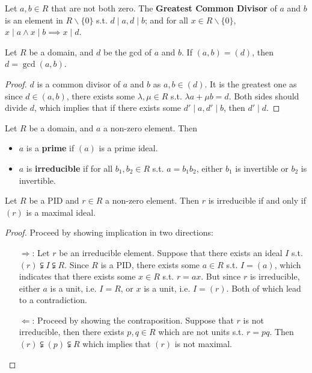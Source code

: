 \documentclass{article}
\begin{document}
\begin{definition}
    Let $a, b\in R$ that are not both zero. The \textbf{Greatest Common Divisor} of $a$ and $b$ is an element in $R\smallsetminus\{0\}$ s.t.
    $d\mid a, d\mid b$; and for all $x\in R\smallsetminus\{0\}$, $x\mid a \wedge x\mid b \implies x \mid d$.
\end{definition}

\begin{proposition}\label{prop:gcd ideal}
    Let $R$ be a domain, and $d$ be the gcd of $a$ and $b$. If $(a, b) = (d)$, then $d = \gcd(a, b)$. 
\end{proposition}

\begin{proof}
    $d$ is a common divisor of $a$ and $b$ as $a, b\in (d)$. It is the greatest one as since $d\in (a, b)$, there exists some $\lambda, \mu\in R$ s.t. $\lambda a + \mu b = d$. Both sides should divide $d$, which implies that if there exists some $d' \mid a, d'\mid b$, then $d' \mid d$.
\end{proof}

\begin{definition}
    Let $R$ be a domain, and $a$ a non-zero element. Then
    \begin{itemize}
        \item $a$ is a \textbf{prime} if $(a)$ is a prime ideal.
        \item $a$ is \textbf{irreducible} if for all $b_1, b_2\in R$ s.t. $a = b_1 b_2$, either $b_1$ is invertible or $b_2$ is invertible.
    \end{itemize}
\end{definition}

\begin{proposition}\label{prop:irreducible implies maximal}
    Let $R$ be a PID and $r\in R$ a non-zero element. Then $r$ is irreducible if and only if $(r)$ is a maximal ideal.
\end{proposition}

\begin{proof}
    Proceed by showing implication in two directions:
    \begin{itemize}
        \item[$\Rightarrow$:] Let $r$ be an irreducible element. Suppose that there exists an ideal $I$ s.t. $(r) \subsetneqq I \subsetneqq R$. Since $R$ is a PID, there exists some $a\in R$ s.t. $I = (a)$, which indicates that there exists some $x\in R$ s.t. $r = ax$. But since $r$ is irreducible, either $a$ is a unit, i.e. $I = R$, or $x$ is a unit, i.e. $I = (r)$. Both of which lead to a contradiction.
        \item[$\Leftarrow$:] Proceed by showing the contraposition. Suppose that $r$ is not irreducible, then there exists $p, q\in R$ which are not units s.t. $r = pq$. Then $(r) \subsetneqq (p) \subsetneqq R$ which implies that $(r)$ is not maximal.
    \end{itemize}
\end{proof}
\end{document}
